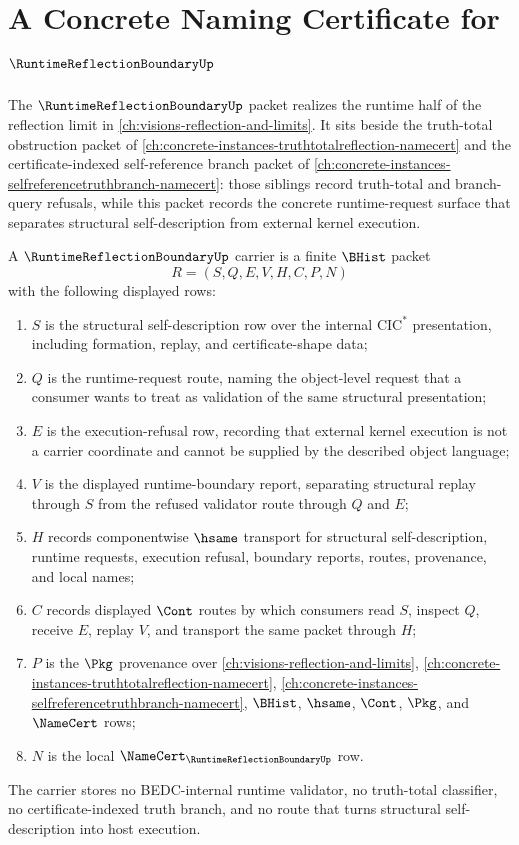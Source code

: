 \chapter{A Concrete Naming Certificate for $\RuntimeReflectionBoundaryUp$}
\label{ch:concrete-instances-runtime-reflection-boundary-namecert}

The $\RuntimeReflectionBoundaryUp$ packet realizes the runtime half of the reflection limit in \autoref{ch:visions-reflection-and-limits}. It sits beside the truth-total obstruction packet of \autoref{ch:concrete-instances-truthtotalreflection-namecert} and the certificate-indexed self-reference branch packet of \autoref{ch:concrete-instances-selfreferencetruthbranch-namecert}: those siblings record truth-total and branch-query refusals, while this packet records the concrete runtime-request surface that separates structural self-description from external kernel execution.

\begin{definition}
\label{def:runtime-reflection-boundary-carrier}
A $\RuntimeReflectionBoundaryUp$ carrier is a finite $\BHist$ packet
$$
R=(S,Q,E,V,H,C,P,N)
$$
with the following displayed rows:
\begin{enumerate}
\item $S$ is the structural self-description row over the internal $\mathrm{CIC}^{*}$ presentation, including formation, replay, and certificate-shape data;
\item $Q$ is the runtime-request route, naming the object-level request that a consumer wants to treat as validation of the same structural presentation;
\item $E$ is the execution-refusal row, recording that external kernel execution is not a carrier coordinate and cannot be supplied by the described object language;
\item $V$ is the displayed runtime-boundary report, separating structural replay through $S$ from the refused validator route through $Q$ and $E$;
\item $H$ records componentwise $\hsame$ transport for structural self-description, runtime requests, execution refusal, boundary reports, routes, provenance, and local names;
\item $C$ records displayed $\Cont$ routes by which consumers read $S$, inspect $Q$, receive $E$, replay $V$, and transport the same packet through $H$;
\item $P$ is the $\Pkg$ provenance over \autoref{ch:visions-reflection-and-limits}, \autoref{ch:concrete-instances-truthtotalreflection-namecert}, \autoref{ch:concrete-instances-selfreferencetruthbranch-namecert}, $\BHist$, $\hsame$, $\Cont$, $\Pkg$, and $\NameCert$ rows;
\item $N$ is the local $\NameCert_{\RuntimeReflectionBoundaryUp}$ row.
\end{enumerate}
The carrier stores no BEDC-internal runtime validator, no truth-total classifier, no certificate-indexed truth branch, and no route that turns structural self-description into host execution.
\end{definition}

